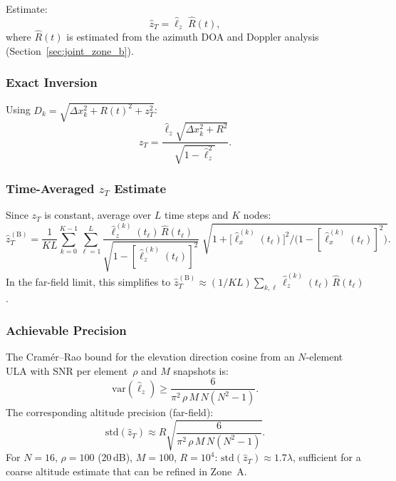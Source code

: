 \documentclass[11pt,a4paper]{article}
\begin{document}
Estimate:
\begin{equation}
  \boxed{\hat{z}_T = \hat{\ell}_z\;\hat{R}(t),}
  \label{eq:zT_from_lz}
\end{equation}
where $\hat{R}(t)$ is estimated from the azimuth DOA and Doppler
analysis (Section~\ref{sec:joint_zone_b}).

\subsubsection{Exact Inversion}

Using $D_k=\sqrt{\Delta x_k^2+R(t)^2+z_T^2}$:
\begin{equation}
  z_T = \frac{\hat{\ell}_z\sqrt{\Delta x_k^2+R^2}}
  {\sqrt{1-\hat{\ell}_z^2}}.
  \label{eq:zT_exact}
\end{equation}

\subsubsection{Time-Averaged $z_T$ Estimate}

Since $z_T$ is constant, average over $L$ time steps and $K$ nodes:
\begin{equation}
  \hat{z}_T^{(\mathrm{B})} = \frac{1}{KL}\sum_{k=0}^{K-1}
  \sum_{\ell=1}^{L}
  \frac{\hat{\ell}_z^{(k)}(t_\ell)\,\hat{R}(t_\ell)}
  {\sqrt{1-[\hat{\ell}_z^{(k)}(t_\ell)]^2}}\;\!
  \sqrt{1+\bigl[\hat{\ell}_x^{(k)}(t_\ell)\bigr]^2
  /\bigl(1-[\hat{\ell}_x^{(k)}(t_\ell)]^2\bigr)}.
  \label{eq:zT_averaged}
\end{equation}
In the far-field limit, this simplifies to
$\hat{z}_T^{(\mathrm{B})}\approx(1/KL)\sum_{k,\ell}
\hat{\ell}_z^{(k)}(t_\ell)\,\hat{R}(t_\ell)$.

\subsubsection{Achievable Precision}

The Cram\'er--Rao bound for the elevation direction cosine from an
$N$-element ULA with SNR per element~$\rho$ and $M$ snapshots is:
\begin{equation}
  \mathrm{var}(\hat{\ell}_z)
  \ge \frac{6}{\pi^2\,\rho\,M\,N(N^2{-}1)}.
  \label{eq:crb_lz}
\end{equation}
The corresponding altitude precision (far-field):
\begin{equation}
  \mathrm{std}(\hat{z}_T) \approx R
  \sqrt{\frac{6}{\pi^2\,\rho\,M\,N(N^2{-}1)}}.
  \label{eq:std_zT}
\end{equation}
For $N=16$, $\rho=100$ (20\,dB), $M=100$, $R=10^4$:
$\mathrm{std}(\hat{z}_T)\approx 1.7\lambda$, sufficient for a
coarse altitude estimate that can be refined in Zone~A.
\end{document}
